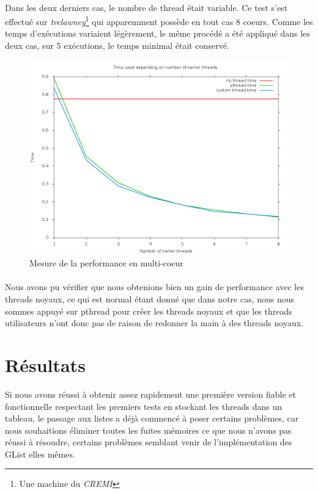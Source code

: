 \documentclass{article}
\begin{document}
    \paragraph{}
    Dans les deux derniers cas, le nombre de thread était variable. Ce test
    s'est effectué sur {\em trelawney}\footnote{Une machine du {\em CREMI}}
    qui apparemment possède en tout cas 8 coeurs. Comme les temps
    d'exécutions variaient légèrement, le même procédé a été appliqué dans
    les deux cas, sur 5 exécutions, le temps minimal était conservé.
    \begin{figure}[H]
      \caption{Mesure de la performance en multi-coeur}
      \includegraphics[width=\textwidth]{compare.png}
    \end{figure}
    \paragraph{}
    Nous avons pu vérifier que nous obtenions bien un gain de performance
    avec les threads noyaux, ce qui est normal étant donné que dans notre
    cas, nous nous sommes appuyé sur pthread pour créer les threads noyaux et
    que les threads utilisateurs n'ont donc pas de raison de redonner la main
    à des threads noyaux.



	\section{Résultats}
    Si nous avons réussi à obtenir assez rapidement une première version
    fiable et fonctionnelle respectant les premiers tests en stockant les
    threads dans un tableau, le passage aux listes a déjà commencé à poser
    certains problèmes, car nous souhaitions éliminer toutes les fuites
    mémoires ce que nous n'avons pas réussi à résoudre, certains problèmes
    semblant venir de l'implémentation des GList elles mêmes.
\end{document}
